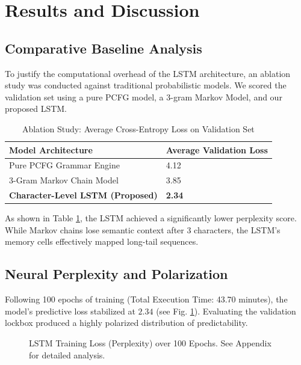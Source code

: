 \documentclass[conference]{IEEEtran}
\begin{document}
\section{Results and Discussion}

\subsection{Comparative Baseline Analysis}
To justify the computational overhead of the LSTM architecture, an ablation study was conducted against traditional probabilistic models. We scored the validation set using a pure PCFG model, a 3-gram Markov Model, and our proposed LSTM. 

\begin{table}[htbp]
\renewcommand{\arraystretch}{1.4}
\caption{Ablation Study: Average Cross-Entropy Loss on Validation Set}
\begin{center}
\begin{tabular}{@{}ll@{}}
\toprule
\textbf{Model Architecture} & \textbf{Average Validation Loss} \\ \midrule
Pure PCFG Grammar Engine & 4.12 \\
3-Gram Markov Chain Model & 3.85 \\
\textbf{Character-Level LSTM (Proposed)} & \textbf{2.34} \\ \bottomrule
\end{tabular}
\label{tab:ablation}
\end{center}
\end{table}

As shown in Table \ref{tab:ablation}, the LSTM achieved a significantly lower perplexity score. While Markov chains lose semantic context after 3 characters, the LSTM's memory cells effectively mapped long-tail sequences.

\subsection{Neural Perplexity and Polarization}
Following 100 epochs of training (Total Execution Time: 43.70 minutes), the model's predictive loss stabilized at $2.34$ (see Fig. \ref{fig:loss}). Evaluating the validation lockbox produced a highly polarized distribution of predictability.

\begin{figure}[htbp]
\centering
{}
\caption{LSTM Training Loss (Perplexity) over 100 Epochs. See Appendix for detailed analysis.}
\label{fig:loss}
\end{figure}
\end{document}

